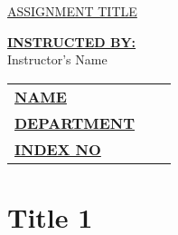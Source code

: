 \documentclass[12pt,a4paper]{article}
\begin{document}
\begin{titlepage}
	
	\begin{flushright}
		\textbf{\uppercase{\fontsize{12}{18} \selectfont {Assignment No: 01}}}
	\end{flushright}
	
	\vspace*{\fill}
	\begin{center}
		\uppercase{\fontsize{30}{45}\selectfont \ul{Assignment Title}}
	\end{center}
	\vfill %
	\begin{multicols}{2}
		\noindent\textbf{\underline{INSTRUCTED BY:}} \\Instructor's Name
		\columnbreak	
		\begin{tabular}{lll}
			\vspace{6pt}
			
			\textbf{\uppercase{\underline{Name}}}       & \textbf{\uppercase{\fontsize{12}{18} \selectfont {:}}} {\fontsize{12}{18} \selectfont {<Name>}}        \\
			
			\vspace{6pt}
			\textbf{\uppercase{\underline{Department}}} & \textbf{\uppercase{\fontsize{12}{18} \selectfont {:}}} {\fontsize{12}{18} \selectfont {<Department>}}       \\
			
			\vspace{6pt}
			\textbf{\uppercase{\underline{Index No}}}   & \textbf{\uppercase{\fontsize{12}{18} \selectfont {:}}} {\fontsize{12}{18} \selectfont {<Index No>}}          \\

			
			
		\end{tabular}
	\end{multicols}
	
\end{titlepage}


\tableofcontents
\newpage
{}
\setcounter{page}{1}

\section{Title 1}
\end{document}
